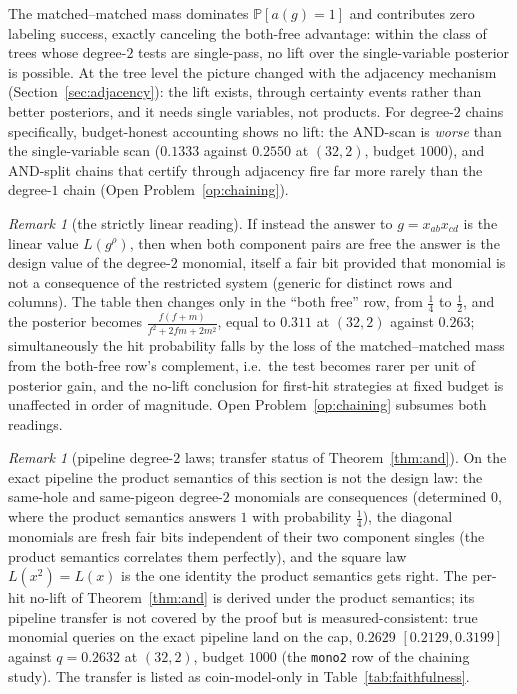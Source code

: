 \documentclass[11pt]{article}
\theoremstyle{definition}
\theoremstyle{remark}
\newtheorem{remark}[theorem]{Remark}
\newcommand{\Prob}{\mathbb{P}}
\begin{document}
The matched--matched mass dominates $\Prob[a(g)=1]$ and contributes zero
labeling success, exactly canceling the both-free advantage: within the
class of trees whose degree-$2$ tests are single-pass, no lift over the
single-variable posterior is possible.  At the tree level the picture
changed with the adjacency mechanism (Section~\ref{sec:adjacency}): the
lift exists, through certainty events rather than better posteriors,
and it needs single variables, not products.  For degree-$2$ chains
specifically, budget-honest accounting shows no lift: the AND-scan is
\emph{worse} than the single-variable scan ($0.1333$ against $0.2550$
at $(32,2)$, budget $1000$), and AND-split chains that certify through
adjacency fire far more rarely than the degree-$1$ chain
(Open Problem~\ref{op:chaining}).

\begin{remark}[the strictly linear reading]\label{rem:linear-reading}
If instead the answer to $g=x_{ab}x_{cd}$ is the linear value
$L(g^\rho)$, then when both component pairs are free the answer is the
design value of the degree-$2$ monomial, itself a fair bit provided that
monomial is not a consequence of the restricted system (generic for
distinct rows and columns).  The table then changes only in the
``both free'' row, from $\frac14$ to $\frac12$, and the posterior
becomes $\frac{f(f+m)}{f^2+2fm+2m^2}$, equal to $0.311$ at $(32,2)$
against $0.263$; simultaneously the hit probability falls by the loss of
the matched--matched mass from the both-free row's complement, i.e.\ the
test becomes rarer per unit of posterior gain, and the no-lift
conclusion for first-hit strategies at fixed budget is unaffected in
order of magnitude.  Open Problem~\ref{op:chaining} subsumes both
readings.
\end{remark}

\begin{remark}[pipeline degree-$2$ laws; transfer status of
Theorem~\ref{thm:and}]\label{rem:andpipeline}
On the exact pipeline the product semantics of this section is not the
design law: the same-hole and same-pigeon degree-$2$ monomials are
consequences (determined $0$, where the product semantics answers $1$
with probability $\tfrac14$), the diagonal monomials are fresh fair
bits independent of their two component singles (the product semantics
correlates them perfectly), and the square law $L(x^2)=L(x)$ is the
one identity the product semantics gets right.  The per-hit no-lift of
Theorem~\ref{thm:and} is derived under the product semantics; its
pipeline transfer is not covered by the proof but is
measured-consistent: true monomial queries on the exact pipeline land
on the cap, $0.2629$ $[0.2129,0.3199]$ against $q=0.2632$ at $(32,2)$,
budget $1000$ (the \texttt{mono2} row of the chaining study).  The
transfer is listed as coin-model-only in
Table~\ref{tab:faithfulness}.
\end{remark}
\end{document}
